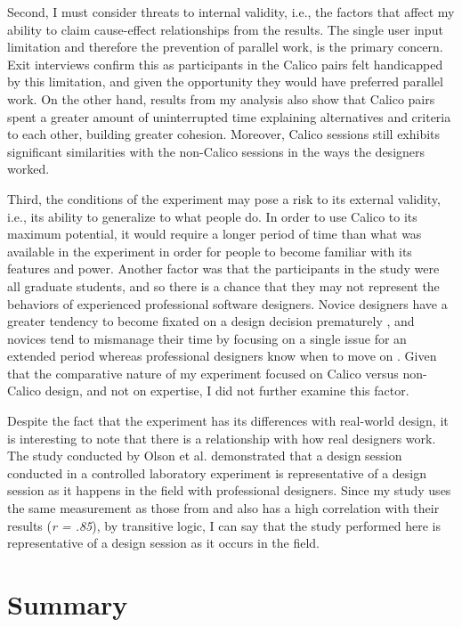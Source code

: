 \documentclass[12pt,fleqn]{ucithesis}
\begin{document}
Second, I must consider threats to internal validity, i.e., the factors that affect my ability to claim cause-effect relationships from the results. The single user input limitation and therefore the prevention of parallel work, is the primary concern. Exit interviews confirm this as participants in the Calico pairs felt handicapped by this limitation, and given the opportunity they would have preferred parallel work. On the other hand, results from my analysis also show that Calico pairs spent a greater amount of uninterrupted time explaining alternatives and criteria to each other, building greater cohesion. Moreover, Calico sessions still exhibits significant similarities with the non-Calico sessions in the ways the designers worked. 

Third, the conditions of the experiment may pose a risk to its external validity, i.e., its ability to generalize to what people do. In order to use Calico to its maximum potential, it would require a longer period of time than what was available in the experiment in order for people to become familiar with its features and power. Another factor was that the participants in the study were all graduate students, and so there is a chance that they may not represent the behaviors of experienced professional software designers. Novice designers have a greater tendency to become fixated on a design decision prematurely \citep{Ball}, and novices tend to mismanage their time by focusing on a single issue for an extended period whereas professional designers know when to move on \citep{Baker}. Given that the comparative nature of my experiment focused on Calico versus non-Calico design, and not on expertise, I did not further examine this factor.

Despite the fact that the experiment has its differences with real-world design, it is interesting to note that there is a relationship with how real designers work. The study conducted by Olson et al. \citep{Olsonb} demonstrated that a design session conducted in a controlled laboratory experiment is representative of a design session as it happens in the field with professional designers. Since my study uses the same measurement as those from \citep{Olsonb} and also has a high correlation with their results (\emph{r = .85}), by transitive logic, I can say that the study performed here is representative of a design session as it occurs in the field.

\section{Summary}
\label{conclusions}
\end{document}
